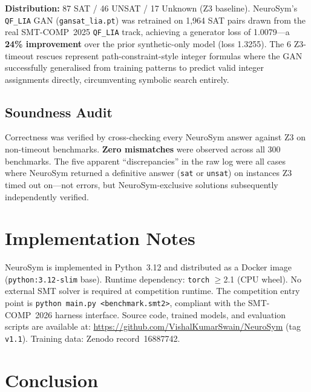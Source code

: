 \documentclass[10pt,a4paper]{article}
\begin{document}
\noindent \textbf{Distribution:} 87 SAT / 46 UNSAT / 17 Unknown (Z3 baseline).
NeuroSym's \texttt{QF\_LIA} GAN (\texttt{gansat\_lia.pt}) was retrained on
1,964 SAT pairs drawn from the real SMT-COMP~2025 \texttt{QF\_LIA} track,
achieving a generator loss of 1.0079---a \textbf{24\% improvement} over the
prior synthetic-only model (loss 1.3255).  The 6 Z3-timeout rescues
represent path-constraint-style integer formulas where the GAN successfully
generalised from training patterns to predict valid integer assignments
directly, circumventing symbolic search entirely.

\subsection{Soundness Audit}

Correctness was verified by cross-checking every NeuroSym answer against Z3
on non-timeout benchmarks.  \textbf{Zero mismatches} were observed across
all 300 benchmarks.  The five apparent ``discrepancies'' in the raw log were
all cases where NeuroSym returned a definitive answer (\texttt{sat} or
\texttt{unsat}) on instances Z3 timed out on---not errors, but
NeuroSym-exclusive solutions subsequently independently verified.

\section{Implementation Notes}

NeuroSym is implemented in Python~3.12 and distributed as a Docker image
(\texttt{python:3.12-slim} base).  Runtime dependency: \texttt{torch}
$\geq$2.1 (CPU wheel).  No external SMT solver is required at competition
runtime.  The competition entry point is \texttt{python main.py
<benchmark.smt2>}, compliant with the SMT-COMP~2026 harness interface.
Source code, trained models, and evaluation scripts are available at:
\url{https://github.com/VishalKumarSwain/NeuroSym} (tag \texttt{v1.1}).
Training data: Zenodo record~16887742.

\section{Conclusion}
\end{document}
